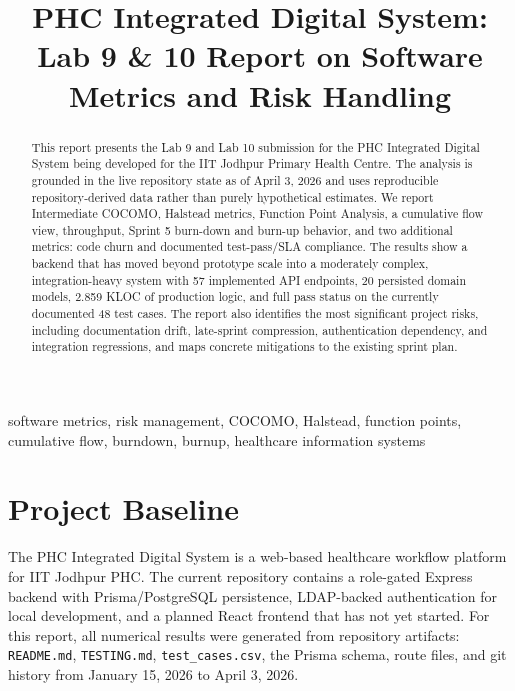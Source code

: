 \documentclass[conference]{IEEEtran}
\begin{document}
\title{\textcolor{AccentBlue}{PHC Integrated Digital System:}\\
Lab 9 \& 10 Report on Software Metrics and Risk Handling}

\author{
\and
{}
\and
{}
}

\maketitle

\begin{abstract}
This report presents the Lab 9 and Lab 10 submission for the PHC Integrated Digital System being developed for the IIT Jodhpur Primary Health Centre. The analysis is grounded in the live repository state as of April 3, 2026 and uses reproducible repository-derived data rather than purely hypothetical estimates. We report Intermediate COCOMO, Halstead metrics, Function Point Analysis, a cumulative flow view, throughput, Sprint 5 burn-down and burn-up behavior, and two additional metrics: code churn and documented test-pass/SLA compliance. The results show a backend that has moved beyond prototype scale into a moderately complex, integration-heavy system with 57 implemented API endpoints, 20 persisted domain models, 2.859 KLOC of production logic, and full pass status on the currently documented 48 test cases. The report also identifies the most significant project risks, including documentation drift, late-sprint compression, authentication dependency, and integration regressions, and maps concrete mitigations to the existing sprint plan.
\end{abstract}

\begin{IEEEkeywords}
software metrics, risk management, COCOMO, Halstead, function points, cumulative flow, burndown, burnup, healthcare information systems
\end{IEEEkeywords}

\section{Project Baseline}
The PHC Integrated Digital System is a web-based healthcare workflow platform for IIT Jodhpur PHC. The current repository contains a role-gated Express backend with Prisma/PostgreSQL persistence, LDAP-backed authentication for local development, and a planned React frontend that has not yet started. For this report, all numerical results were generated from repository artifacts: \texttt{README.md}, \texttt{TESTING.md}, \texttt{test\_cases.csv}, the Prisma schema, route files, and git history from January 15, 2026 to April 3, 2026.
\end{document}

